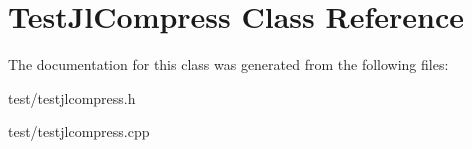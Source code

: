 \section{TestJlCompress Class Reference}
\label{classTestJlCompress}


The documentation for this class was generated from the following files:\begin{DoxyCompactItemize}
\item 
test/testjlcompress.h\item 
test/testjlcompress.cpp\end{DoxyCompactItemize}
